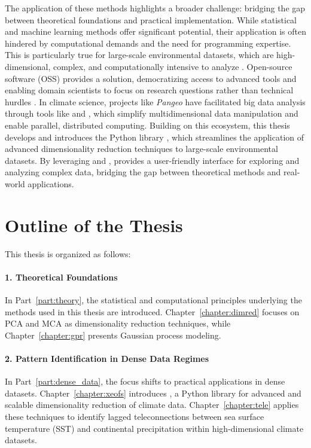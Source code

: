 The application of these methods highlights a broader challenge: bridging the gap between theoretical foundations and practical implementation. While statistical and machine learning methods offer significant potential, their application is often hindered by computational demands and the need for programming expertise. This is particularly true for large-scale environmental datasets, which are high-dimensional, complex, and computationally intensive to analyze \cite{fan_challenges_2013}. Open-source software (OSS) provides a solution, democratizing access to advanced tools and enabling domain scientists to focus on research questions rather than technical hurdles \cite{ince_case_2012}. In climate science, projects like \textit{Pangeo} \cite{pangeo} have facilitated big data analysis through tools like  \cite{hoyer_xarray_2017} and  \cite{dask_development_team_dask_2016}, which simplify multidimensional data manipulation and enable parallel, distributed computing. Building on this ecosystem, this thesis develops and introduces the  Python library \cite{rieger_xeofs_2024}, which streamlines the application of advanced dimensionality reduction techniques to large-scale environmental datasets. By leveraging  and ,  provides a user-friendly interface for exploring and analyzing complex data, bridging the gap between theoretical methods and real-world applications.


\section*{Outline of the Thesis}

This thesis is organized as follows:

\paragraph{1. Theoretical Foundations}
In Part~\ref{part:theory}, the statistical and computational principles underlying the methods used in this thesis are introduced. Chapter~\ref{chapter:dimred} focuses on PCA and MCA as dimensionality reduction techniques, while Chapter~\ref{chapter:gpr} presents Gaussian process modeling.

\paragraph{2. Pattern Identification in Dense Data Regimes}
In Part~\ref{part:dense_data}, the focus shifts to practical applications in dense datasets. Chapter~\ref{chapter:xeofs} introduces , a Python library for advanced and scalable dimensionality reduction of climate data. Chapter~\ref{chapter:tele} applies these techniques to identify lagged teleconnections between sea surface temperature (SST) and continental precipitation within high-dimensional climate datasets.

